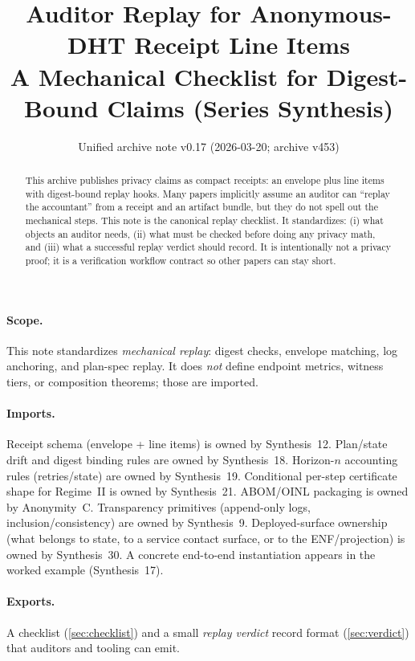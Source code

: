 \documentclass[11pt]{article}
\title{Auditor Replay for Anonymous-DHT Receipt Line Items\\
\large A Mechanical Checklist for Digest-Bound Claims (Series Synthesis)}
\author{}
\date{Unified archive note v0.17 (2026-03-20; archive v453)}
\begin{document}
\maketitle

\begin{abstract}
This archive publishes privacy claims as compact receipts: an envelope plus line items with digest-bound replay hooks.
Many papers implicitly assume an auditor can ``replay the accountant'' from a receipt and an artifact bundle, but they do not spell out the mechanical steps.
This note is the canonical replay checklist.
It standardizes: (i) what objects an auditor needs, (ii) what must be checked before doing any privacy math, and (iii) what a successful replay verdict should record.
It is intentionally not a privacy proof; it is a verification workflow contract so other papers can stay short.
\end{abstract}

\paragraph{Scope.}
This note standardizes \emph{mechanical replay}: digest checks, envelope matching, log anchoring, and plan-spec replay.
It does \emph{not} define endpoint metrics, witness tiers, or composition theorems; those are imported.

\paragraph{Imports.}
Receipt schema (envelope + line items) is owned by Synthesis~12.\cite{series:receiptitems}
Plan/state drift and digest binding rules are owned by Synthesis~18.\cite{series:planstateequiv}
Horizon-$n$ accounting rules (retries/state) are owned by Synthesis~19.\cite{series:accountingrulebook}
Conditional per-step certificate shape for Regime~II is owned by Synthesis~21.\cite{series:condcert}
ABOM/OINL packaging is owned by Anonymity~C.\cite{series:abomoinl}
Transparency primitives (append-only logs, inclusion/consistency) are owned by Synthesis~9.\cite{series:transparencyprimitives}
Deployed-surface ownership (what belongs to state, to a service contact surface, or to the ENF/projection) is owned by Synthesis~30.\cite{series:deployedsurfaces}
A concrete end-to-end instantiation appears in the worked example (Synthesis~17).\cite{series:workedexample}

\paragraph{Exports.}
A checklist (\cref{sec:checklist}) and a small \emph{replay verdict} record format (\cref{sec:verdict}) that auditors and tooling can emit.
\end{document}

